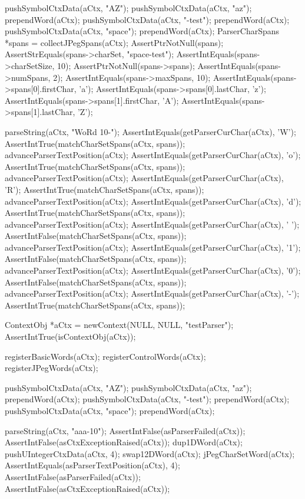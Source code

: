   pushSymbolCtxData(aCtx, "AZ");
  pushSymbolCtxData(aCtx, "az");
  prependWord(aCtx);
  pushSymbolCtxData(aCtx, "-test");
  prependWord(aCtx);
  pushSymbolCtxData(aCtx, "space");
  prependWord(aCtx);
  ParserCharSpans *spans = collectJPegSpans(aCtx);
  AssertPtrNotNull(spans);
  AssertStrEquals(spans->charSet, "space-test");
  AssertIntEquals(spans->charSetSize, 10);
  AssertPtrNotNull(spans->spans);
  AssertIntEquals(spans->numSpans, 2);
  AssertIntEquals(spans->maxSpans, 10);
  AssertIntEquals(spans->spans[0].firstChar, 'a');
  AssertIntEquals(spans->spans[0].lastChar,  'z');
  AssertIntEquals(spans->spans[1].firstChar, 'A');
  AssertIntEquals(spans->spans[1].lastChar,  'Z');
  
  parseString(aCtx, "WoRd 10-");
  AssertIntEquals(getParserCurChar(aCtx), 'W');
  AssertIntTrue(matchCharSetSpans(aCtx, spans));
  advanceParserTextPosition(aCtx);
  AssertIntEquals(getParserCurChar(aCtx), 'o');
  AssertIntTrue(matchCharSetSpans(aCtx, spans));
  advanceParserTextPosition(aCtx);
  AssertIntEquals(getParserCurChar(aCtx), 'R');
  AssertIntTrue(matchCharSetSpans(aCtx, spans));
  advanceParserTextPosition(aCtx);
  AssertIntEquals(getParserCurChar(aCtx), 'd');
  AssertIntTrue(matchCharSetSpans(aCtx, spans));
  advanceParserTextPosition(aCtx);
  AssertIntEquals(getParserCurChar(aCtx), ' ');
  AssertIntFalse(matchCharSetSpans(aCtx, spans));
  advanceParserTextPosition(aCtx);
  AssertIntEquals(getParserCurChar(aCtx), '1');
  AssertIntFalse(matchCharSetSpans(aCtx, spans));
  advanceParserTextPosition(aCtx);
  AssertIntEquals(getParserCurChar(aCtx), '0');
  AssertIntFalse(matchCharSetSpans(aCtx, spans));
  advanceParserTextPosition(aCtx);
  AssertIntEquals(getParserCurChar(aCtx), '-');
  AssertIntTrue(matchCharSetSpans(aCtx, spans));
\stopCTest
\stopTestCase


\startCTest
  ContextObj *aCtx = newContext(NULL, NULL, "testParser");
  AssertIntTrue(isContextObj(aCtx));
  
  registerBasicWords(aCtx);
  registerControlWords(aCtx);
  registerJPegWords(aCtx);
  
  pushSymbolCtxData(aCtx, "AZ");
  pushSymbolCtxData(aCtx, "az");
  prependWord(aCtx);
  pushSymbolCtxData(aCtx, "-test");
  prependWord(aCtx);
  pushSymbolCtxData(aCtx, "space");
  prependWord(aCtx);

  parseString(aCtx, "aaa-10");
  AssertIntFalse(asParserFailed(aCtx));
  AssertIntFalse(asCtxExceptionRaised(aCtx));
  dup1DWord(aCtx);
  pushUIntegerCtxData(aCtx, 4);
  swap12DWord(aCtx);
  jPegCharSetWord(aCtx);
  AssertIntEquals(asParserTextPosition(aCtx), 4);
  AssertIntFalse(asParserFailed(aCtx));
  AssertIntFalse(asCtxExceptionRaised(aCtx));
  
